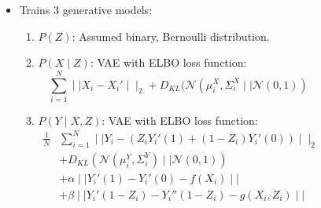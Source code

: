 \documentclass{beamer}
\begin{document}
\begin{frame}
	\frametitle{}
% 
	\begin{columns}
		\begin{column}{0.8 \textwidth}
	\begin{itemize}
		\item Trains $ 3 $ generative models:
			\begin{enumerate}
				\item $ P(Z) $: Assumed binary, Bernoulli distribution.
				\item $ P(X \mid Z) $: VAE with ELBO loss function:
					$$ \sum_{i=1}^{N} \mid \mid X_i - X_i' \mid \mid_2 + D_{KL}(\mathcal{N}(\mu_i^X, \Sigma_i^X \mid \mid \mathcal{N}(0, 1)) $$
				\item $ P(Y \mid X, Z) $: VAE with ELBO loss function:
					\begin{equation*}
						\begin{split}
							\frac{1}{N} & \sum_{i=1}^{N} \mid \mid Y_i - (Z_i Y_i'(1) + (1 - Z_i)Y_i'(0)) \mid \mid_2  \\
							& + D_{KL}(\mathcal{N}(\mu_i^Y, \Sigma_i^Y) \mid \mid \mathcal{N}(0, 1)) \\
							& + \alpha \mid \mid Y_i'(1) - Y_i'(0) - f(X_i) \mid \mid \\
							& + \beta \mid \mid Y_i'(1-Z_i) - Y_i''(1-Z_i) - g(X_i, Z_i) \mid \mid
						\end{split}
					\end{equation*}
			\end{enumerate}
		\end{itemize}
		\end{column}
		\begin{column}{0.2\textwidth}
			\begin{figure}[t]
\end{figure}
\end{column}
\end{columns}
\end{frame}
\end{document}
